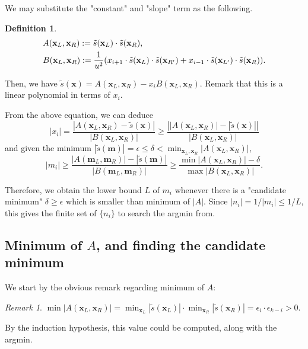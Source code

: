\documentclass{article}
\theoremstyle{definition}
\newtheorem*{definition}{Definition}
\theoremstyle{plain}
\theoremstyle{remark}
\newtheorem*{remark}{Remark}
\numberwithin{equation}{section}
\newcommand{\abs}[1]{\left\lvert{#1}\right\rvert}
\begin{document}
We may substitute the "constant" and "slope" term as the following.
\begin{definition}
  \begin{align*}
    & A(\mathbf{x}_L, \mathbf{x}_R) := \tilde{s}(\mathbf{x}_L) \cdot \tilde{s}(\mathbf{x}_R), \\
    & B(\mathbf{x}_L, \mathbf{x}_R) := \frac{1}{u^2}
    (x_{i+1} \cdot \tilde{s}(\mathbf{x}_L) \cdot \tilde{s}(\mathbf{x}_{R'}) + x_{i-1} \cdot \tilde{s}(\mathbf{x}_{L'}) \cdot \tilde{s}(\mathbf{x}_R)).
  \end{align*}
\end{definition}
Then, we have $\tilde{s}(\mathbf{x}) = A(\mathbf{x}_L, \mathbf{x}_R) - x_i B(\mathbf{x}_L, \mathbf{x}_R)$.
Remark that this is a linear polynomial in terms of $x_i$.

From the above equation, we can deduce
\[
  \abs{x_i} = \frac{\abs{A(\mathbf{x}_L, \mathbf{x}_R) - \tilde{s}(\mathbf{x})}}{\abs{B(\mathbf{x}_L, \mathbf{x}_R)}}
  \geq \frac{\abs{\abs{A(\mathbf{x}_L, \mathbf{x}_R)} - \abs{\tilde{s}(\mathbf{x})}}}{\abs{B(\mathbf{x}_L, \mathbf{x}_R)}}
\]
and given the minimum $\abs{\tilde{s}(\mathbf{m})} = \epsilon \leq \delta
< \min_{\mathbf{x}_L, \mathbf{x}_R} \abs{A(\mathbf{x}_L, \mathbf{x}_R)}$,
\begin{equation}\label{normal_key_condition}
  \abs{m_i}
  \geq \frac{\abs{A(\mathbf{m}_L, \mathbf{m}_R)} - \abs{\tilde{s}(\mathbf{m})}}{\abs{B(\mathbf{m}_L, \mathbf{m}_R)}}
  \geq \frac{\min \abs{A(\mathbf{x}_L, \mathbf{x}_R)} - \delta}{\max \abs{B(\mathbf{x}_L, \mathbf{x}_R)}}.
\end{equation}

Therefore, we obtain the lower bound $L$ of $m_i$
whenever there is a "candidate minimum" $\delta \geq \epsilon$
which is smaller than minimum of $\abs{A}$.
Since $\abs{n_i} = 1 / \abs{m_i} \leq 1 / L$, this gives the finite set of $\{ n_i \}$ to search the argmin from.

\subsection{Minimum of $A$, and finding the candidate minimum}

We start by the obvious remark regarding minimum of $A$:
\begin{remark}
  $\min \abs{A(\mathbf{x}_L, \mathbf{x}_R)}
  = \min_{\mathbf{x}_L} \abs{\tilde{s}(\mathbf{x}_L)} \cdot \min_{\mathbf{x}_R} \abs{\tilde{s}(\mathbf{x}_R)}
  = \epsilon_i \cdot \epsilon_{k-i} > 0$.
\end{remark}
By the induction hypothesis, this value could be computed, along with the argmin.
\end{document}
